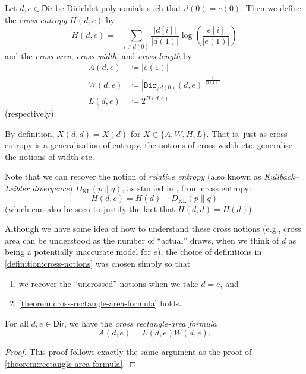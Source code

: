 \documentclass[11pt,fleqn]{article}
\newcommand{\cat}[1]{\mathtt{#1}}
\newcommand{\rig}[1]{\mathsf{#1}}
\newcommand{\Dir}{\rig{Dir}}
\newcommand{\cDir}{\cat{Dir}}
\begin{document}
\begin{definition}
\label{definition:cross-notions}
  Let $d,e\in\Dir$ be Dirichlet polynomials such that $d(0)=e(0)$.
  Then we define the \emph{cross entropy} $H(d,e)$ by
  \[
    H(d,e) = -\sum_{i\in d(0)}\frac{|d[i]|}{|d(1)|}\log\left(\frac{|e[i]|}{|e(1)|}\right)
  \]
  and the \emph{cross area}, \emph{cross width}, and \emph{cross length} by
  \[
    \begin{aligned}
      A(d,e) &\coloneqq |e(1)|
    \\W(d,e) &\coloneqq \left\vert\cDir_{/d(0)}(d,e)\right\vert^{\frac{1}{|d(1)|}}
    \\L(d,e) &\coloneqq 2^{H(d,e)}
    \end{aligned}
  \]
  (respectively).
\end{definition}

By definition, $X(d,d)=X(d)$ for $X\in\{A,W,H,L\}$.
That is, just as cross entropy is a generalisation of entropy, the notions of cross width etc. generalise the notions of width etc.

\begin{remark}
  Note that we can recover the notion of \emph{relative entropy} (also known as \emph{Kullback--Leibler divergence}) $D_{\mathrm{KL}}(p\|q)$, as studied in \cite{BF2014}, from cross entropy:
  \[
    H(d,e) = H(d) + D_{\mathrm{KL}}(p\|q)
  \]
  (which can also be seen to justify the fact that $H(d,d)=H(d)$).
\end{remark}

\begin{remark}
  Although we have some idea of how to understand these cross notions (e.g., cross area can be understood as the number of ``actual'' draws, when we think of $d$ as being a potentially inaccurate model for $e$), the choice of definitions in \cref{definition:cross-notions} was chosen simply so that
  \begin{enumerate}
    \item we recover the ``uncrossed'' notions when we take $d=e$, and
    \item \cref{theorem:cross-rectangle-area-formula} holds.\qedhere
  \end{enumerate}
\end{remark}

\begin{theorem}
\label{theorem:cross-rectangle-area-formula}
  For all $d,e\in\Dir$, we have the \emph{cross rectangle-area formula}
  \[
    A(d,e) = L(d,e)W(d,e).
  \]
\end{theorem}

\begin{proof}
  This proof follows exactly the same argument as the proof of \cref{theorem:rectangle-area-formula}.
\end{proof}



\printbibliography[heading=bibintoc,title=Bibliography]
\end{document}
